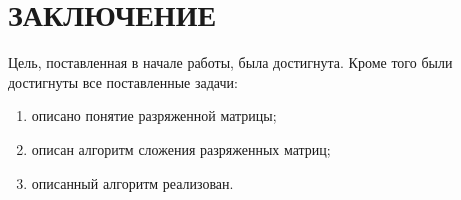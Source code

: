 \chapter*{\hfill{\centering  ЗАКЛЮЧЕНИЕ}\hfill}

Цель, поставленная в начале работы, была достигнута. 
Кроме того были достигнуты все поставленные задачи:
\begin{enumerate}
	\item описано понятие разряженной матрицы;
	\item описан алгоритм сложения разряженных матриц;
	\item описанный алгоритм реализован.
\end{enumerate}

